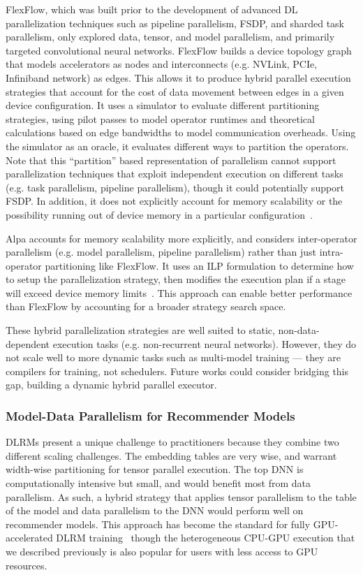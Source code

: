 FlexFlow, which was built prior to the development of advanced DL parallelization techniques such as pipeline parallelism, FSDP, and sharded task parallelism, only explored data, tensor, and model parallelism, and primarily targeted convolutional neural networks. FlexFlow builds a device topology graph that models accelerators as nodes and interconnects (e.g. NVLink, PCIe, Infiniband network) as edges. This allows it to produce hybrid parallel execution strategies that account for the cost of data movement between edges in a given device configuration. It uses a simulator to evaluate different partitioning strategies, using pilot passes to model operator runtimes and theoretical calculations based on edge bandwidths to model communication overheads. Using the simulator as an oracle, it evaluates different ways to partition the operators. Note that this ``partition'' based representation of parallelism cannot support parallelization techniques that exploit independent execution on different tasks (e.g. task parallelism, pipeline parallelism), though it could potentially support FSDP. In addition, it does not explicitly account for memory scalability or the possibility running out of device memory in a particular configuration~\cite{memflow2020}.

Alpa 	accounts for memory scalability more explicitly, and considers inter-operator parallelism (e.g. model parallelism, pipeline parallelism) rather than just intra-operator partitioning like FlexFlow. It uses an ILP formulation to determine how to setup the parallelization strategy, then modifies the execution plan if a stage will exceed device memory limits~\cite{alpa2022}. This approach can enable better performance than FlexFlow by accounting for a broader strategy search space.

These hybrid parallelization strategies are well suited to static, non-data-dependent execution tasks (e.g. non-recurrent neural networks). However, they do not scale well to more dynamic tasks such as multi-model training --- they are compilers for training, not schedulers. Future works could consider bridging this gap, building a dynamic hybrid parallel executor.

\subsubsection{Model-Data Parallelism for Recommender Models}
DLRMs present a unique challenge to practitioners because they combine two different scaling challenges. The embedding tables are very wise, and warrant width-wise partitioning for tensor parallel execution. The top DNN is computationally intensive but small, and would benefit most from data parallelism.  As such, a hybrid strategy that applies tensor parallelism to the table of the model and data parallelism to the DNN would perform well on recommender models. This approach has become the standard for fully GPU-accelerated DLRM training~\cite{dlrm2019} though the heterogeneous CPU-GPU execution that we described previously is also popular for users with less access to GPU resources. 

